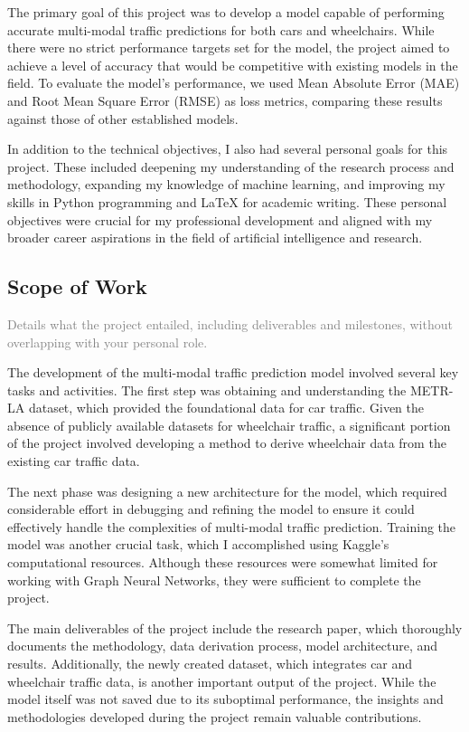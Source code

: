 The primary goal of this project was to develop a model capable of performing accurate multi-modal traffic predictions
for both cars and wheelchairs.
While there were no strict performance targets set for the model, the project aimed to achieve a level of accuracy that
would be competitive with existing models in the field.
To evaluate the model's performance, we used Mean Absolute Error (MAE) and Root Mean Square Error (RMSE) as loss
metrics, comparing these results against those of other established models.

In addition to the technical objectives, I also had several personal goals for this project.
These included deepening my understanding of the research process and methodology, expanding my knowledge of machine
learning, and improving my skills in Python programming and LaTeX for academic writing.
These personal objectives were crucial for my professional development and aligned with my broader career aspirations in
the field of artificial intelligence and research.

\subsection{Scope of Work}\label{subsec:scope-of-work}
\textcolor{gray}
{Details what the project entailed, including deliverables and milestones, without overlapping with your personal role.
}

The development of the multi-modal traffic prediction model involved several key tasks and activities.
The first step was obtaining and understanding the METR-LA dataset, which provided the foundational data for car
traffic.
Given the absence of publicly available datasets for wheelchair traffic, a significant portion of the project involved
developing a method to derive wheelchair data from the existing car traffic data.

The next phase was designing a new architecture for the model, which required considerable effort in debugging and
refining the model to ensure it could effectively handle the complexities of multi-modal traffic prediction.
Training the model was another crucial task, which I accomplished using Kaggle's computational resources.
Although these resources were somewhat limited for working with Graph Neural Networks, they were sufficient to complete
the project.

The main deliverables of the project include the research paper, which thoroughly documents the methodology, data
derivation process, model architecture, and results.
Additionally, the newly created dataset, which integrates car and wheelchair traffic data, is another important output
of the project.
While the model itself was not saved due to its suboptimal performance, the insights and methodologies developed during
the project remain valuable contributions.

